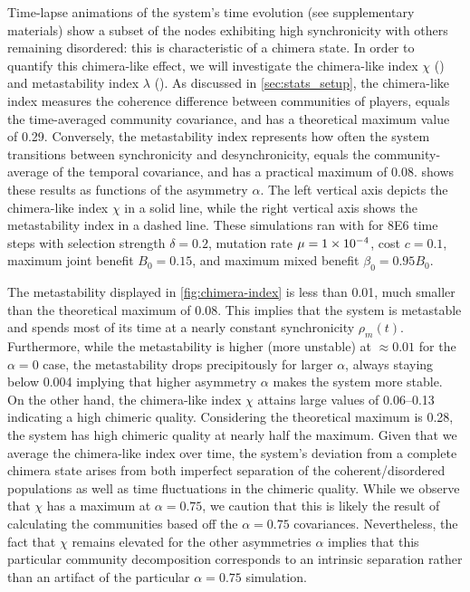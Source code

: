 \documentclass[pdflatex,twocolumn,sn-nature,super]{sn-jnl}
\begin{document}
Time-lapse animations of the system's time evolution
(see supplementary materials)
show a subset of the nodes exhibiting high synchronicity
with others remaining disordered: this is characteristic of a chimera state.
In order to quantify this chimera-like effect, we will investigate
the chimera-like index $\chi$ ()
and metastability index $\lambda$ ().
As discussed in \cref{sec:stats_setup},
the chimera-like index
measures the coherence difference between communities of players,
equals the time-averaged community covariance,
and has a theoretical maximum value of \num{0.29}.
Conversely, the metastability index
represents how often the system transitions
between synchronicity and desynchronicity,
equals the community-average of the temporal covariance,
and has a practical maximum of \num{0.08}.
 shows these results
as functions of the asymmetry $\alpha$.
The left vertical axis depicts the chimera-like index $\chi$
in a solid line,
while the right vertical axis shows the metastability index
in a dashed line.
These simulations ran with
for \num{8E6} time steps with
selection strength $\delta = 0.2$,
mutation rate $\mu=\num{1E-4}$,
cost $c = \num{0.1}$,
maximum joint benefit $B_0 = 0.15$,
and maximum mixed benefit $\beta_0 = \num{0.95} B_0$.

The metastability displayed in \cref{fig:chimera-index}
is less than \num{0.01}, much smaller
than the theoretical maximum of \num{0.08}.
This implies that the system is metastable
and spends most of its time at a nearly constant
synchronicity $\rho_m(t)$.
Furthermore, while the metastability is higher (more unstable)
at $\approx \num{0.01}$ for the $\alpha = 0$ case,
the metastability drops precipitously for larger $\alpha$,
always staying below \num{0.004} implying that
higher asymmetry $\alpha$ makes the system more stable.
On the other hand, the chimera-like index $\chi$
attains large values of \numrange{0.06}{0.13}
indicating a high chimeric quality.
Considering the theoretical maximum is \num{0.28},
the system has high chimeric quality at nearly half the maximum.
Given that we average the chimera-like index over time,
the system's deviation from a complete chimera state
arises from both imperfect separation of the coherent/disordered populations
as well as time fluctuations in the chimeric quality.
While we observe that $\chi$ has a maximum at $\alpha = \num{0.75}$,
we caution that this is likely the result of calculating the communities
based off the $\alpha = \num{0.75}$ covariances.
Nevertheless, the fact that $\chi$ remains elevated
for the other asymmetries $\alpha$
implies that this particular community decomposition
corresponds to an intrinsic separation rather than an artifact
of the particular $\alpha = \num{0.75}$ simulation.
\end{document}
